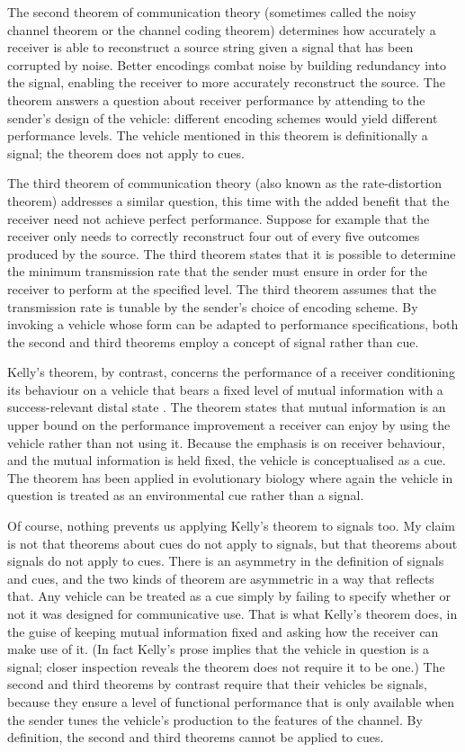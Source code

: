 \documentclass[12pt]{article}
\begin{document}
The second theorem of communication theory (sometimes called the noisy channel theorem or the channel coding theorem) determines how accurately a receiver is able to reconstruct a source string given a signal that has been corrupted by noise.
Better encodings combat noise by building redundancy into the signal, enabling the receiver to more accurately reconstruct the source.
The theorem answers a question about receiver performance by attending to the sender's design of the vehicle: different encoding schemes would yield different performance levels.
The vehicle mentioned in this theorem is definitionally a signal; the theorem does not apply to cues.

The third theorem of communication theory (also known as the rate-distortion theorem) addresses a similar question, this time with the added benefit that the receiver need not achieve perfect performance.
Suppose for example that the receiver only needs to correctly reconstruct four out of every five outcomes produced by the source.
The third theorem states that it is possible to determine the minimum transmission rate that the sender must ensure in order for the receiver to perform at the specified level.
The third theorem assumes that the transmission rate is tunable by the sender's choice of encoding scheme.
By invoking a vehicle whose form can be adapted to performance specifications, both the second and third theorems employ a concept of signal rather than cue.

Kelly's theorem, by contrast, concerns the performance of a receiver conditioning its behaviour on a vehicle that bears a fixed level of mutual information with a success-relevant distal state \citep{kelly1956new}.
The theorem states that mutual information is an upper bound on the performance improvement a receiver can enjoy by using the vehicle rather than not using it.
Because the emphasis is on receiver behaviour, and the mutual information is held fixed, the vehicle is conceptualised as a cue.
The theorem has been applied in evolutionary biology \citep{donaldson-matasci2010fitness} where again the vehicle in question is treated as an environmental cue rather than a signal.

Of course, nothing prevents us applying Kelly's theorem to signals too.
My claim is not that theorems about cues do not apply to signals, but that theorems about signals do not apply to cues.
There is an asymmetry in the definition of signals and cues, and the two kinds of theorem are asymmetric in a way that reflects that.
Any vehicle can be treated as a cue simply by failing to specify whether or not it was designed for communicative use.
That is what Kelly's theorem does, in the guise of keeping mutual information fixed and asking how the receiver can make use of it.
(In fact Kelly's prose implies that the vehicle in question is a signal; closer inspection reveals the theorem does not require it to be one.)
The second and third theorems by contrast require that their vehicles be signals, because they ensure a level of functional performance that is only available when the sender tunes the vehicle's production to the features of the channel.
By definition, the second and third theorems cannot be applied to cues.
\end{document}
